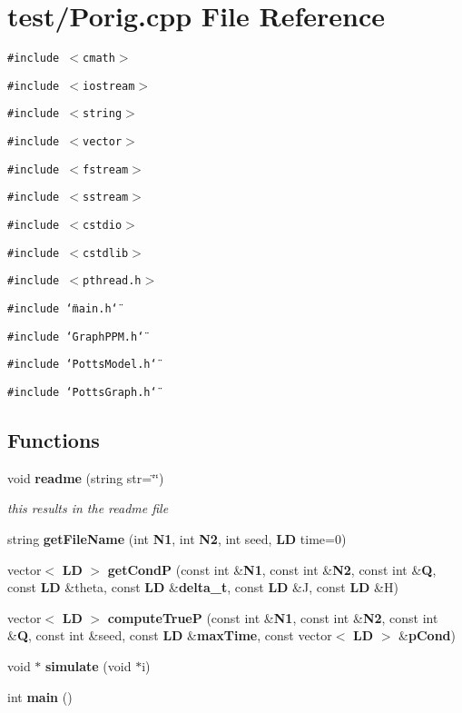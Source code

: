 \section{test/Porig.cpp File Reference}
\label{Porig_8cpp}
{\tt \#include $<$cmath$>$}\par
{\tt \#include $<$iostream$>$}\par
{\tt \#include $<$string$>$}\par
{\tt \#include $<$vector$>$}\par
{\tt \#include $<$fstream$>$}\par
{\tt \#include $<$sstream$>$}\par
{\tt \#include $<$cstdio$>$}\par
{\tt \#include $<$cstdlib$>$}\par
{\tt \#include $<$pthread.h$>$}\par
{\tt \#include \char`\"{}main.h\char`\"{}}\par
{\tt \#include \char`\"{}GraphPPM.h\char`\"{}}\par
{\tt \#include \char`\"{}PottsModel.h\char`\"{}}\par
{\tt \#include \char`\"{}PottsGraph.h\char`\"{}}\par
\subsection*{Functions}
\begin{CompactItemize}
\item 
void {\bf readme} (string str=\char`\"{}\char`\"{})
\begin{CompactList}\small\item\em this results in the readme file \item\end{CompactList}\item 
string {\bf getFileName} (int {\bf N1}, int {\bf N2}, int seed, {\bf LD} time=0)
\item 
vector$<$ {\bf LD} $>$ {\bf getCondP} (const int \&{\bf N1}, const int \&{\bf N2}, const int \&{\bf Q}, const {\bf LD} \&theta, const {\bf LD} \&{\bf delta\_\-t}, const {\bf LD} \&J, const {\bf LD} \&H)
\item 
vector$<$ {\bf LD} $>$ {\bf computeTrueP} (const int \&{\bf N1}, const int \&{\bf N2}, const int \&{\bf Q}, const int \&seed, const {\bf LD} \&{\bf maxTime}, const vector$<$ {\bf LD} $>$ \&{\bf pCond})
\item 
void $\ast$ {\bf simulate} (void $\ast$i)
\item 
int {\bf main} ()
\end{CompactItemize}
